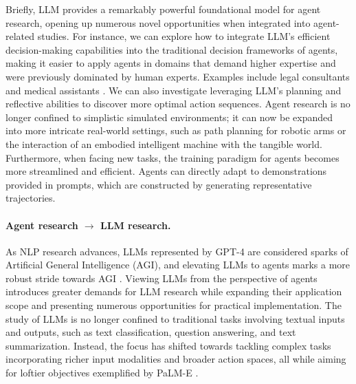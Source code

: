 Briefly, LLM provides a remarkably powerful foundational model for agent research, opening up numerous novel opportunities when integrated into agent-related studies. 
For instance, we can explore how to integrate LLM's efficient decision-making capabilities into the traditional decision frameworks of agents, making it easier to apply agents in domains that demand higher expertise and were previously dominated by human experts. 
Examples include legal consultants and medical assistants \cite{DBLP:journals/corr/abs-2303-17071,DBLP:journals/corr/abs-2308-10848}. 
We can also investigate leveraging LLM's planning and reflective abilities to discover more optimal action sequences. 
Agent research is no longer confined to simplistic simulated environments; it can now be expanded into more intricate real-world settings, such as path planning for robotic arms or the interaction of an embodied intelligent machine with the tangible world. 
Furthermore, when facing new tasks, the training paradigm for agents becomes more streamlined and efficient. 
Agents can directly adapt to demonstrations provided in prompts, which are constructed by generating representative trajectories. 



\paragraph{Agent research $\rightarrow$ LLM research.}
As NLP research advances, LLMs represented by GPT-4 are considered sparks of Artificial General Intelligence (AGI), and elevating LLMs to agents marks a more robust stride towards AGI \cite{DBLP:journals/corr/abs-2303-12712}. 
Viewing LLMs from the perspective of agents introduces greater demands for LLM research while expanding their application scope and presenting numerous opportunities for practical implementation. 
The study of LLMs is no longer confined to traditional tasks involving textual inputs and outputs, such as text classification, question answering, and text summarization. Instead, the focus has shifted towards tackling complex tasks incorporating richer input modalities and broader action spaces, all while aiming for loftier objectives exemplified by PaLM-E \cite{DBLP:conf/icml/DriessXSLCIWTVY23}.

